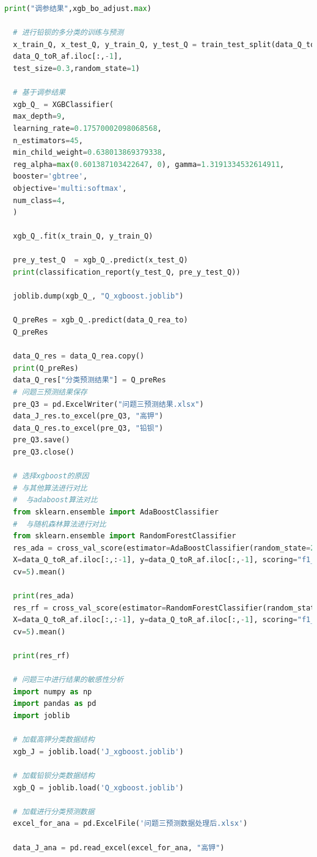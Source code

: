 \documentclass[withoutpreface,bwprint]{cumcmthesis} %
\begin{document}
\begin{appendices}
\begin{lstlisting}[language=python]
  print("调参结果",xgb_bo_adjust.max)
  
  # 进行铅钡的多分类的训练与预测
  x_train_Q, x_test_Q, y_train_Q, y_test_Q = train_test_split(data_Q_toR_af.iloc[:,:-1],
  data_Q_toR_af.iloc[:,-1],
  test_size=0.3,random_state=1)
  
  # 基于调参结果
  xgb_Q_ = XGBClassifier(
  max_depth=9,
  learning_rate=0.17570002098068568,
  n_estimators=45,
  min_child_weight=0.638013869379338,
  reg_alpha=max(0.601387103422647, 0), gamma=1.3191334532614911,
  booster='gbtree',
  objective='multi:softmax',
  num_class=4,
  )
  
  xgb_Q_.fit(x_train_Q, y_train_Q)
  
  pre_y_test_Q  = xgb_Q_.predict(x_test_Q)
  print(classification_report(y_test_Q, pre_y_test_Q))
  
  joblib.dump(xgb_Q_, "Q_xgboost.joblib")
  
  Q_preRes = xgb_Q_.predict(data_Q_rea_to)
  Q_preRes
  
  data_Q_res = data_Q_rea.copy()
  print(Q_preRes)
  data_Q_res["分类预测结果"] = Q_preRes
  # 问题三预测结果保存
  pre_Q3 = pd.ExcelWriter("问题三预测结果.xlsx")
  data_J_res.to_excel(pre_Q3, "高钾")
  data_Q_res.to_excel(pre_Q3, "铅钡")
  pre_Q3.save()
  pre_Q3.close()
  
  # 选择xgboost的原因
  # 与其他算法进行对比
  #  与adaboost算法对比
  from sklearn.ensemble import AdaBoostClassifier
  #  与随机森林算法进行对比
  from sklearn.ensemble import RandomForestClassifier
  res_ada = cross_val_score(estimator=AdaBoostClassifier(random_state=2022), 
  X=data_Q_toR_af.iloc[:,:-1], y=data_Q_toR_af.iloc[:,-1], scoring="f1_macro",
  cv=5).mean()
  
  print(res_ada)
  res_rf = cross_val_score(estimator=RandomForestClassifier(random_state=2022), 
  X=data_Q_toR_af.iloc[:,:-1], y=data_Q_toR_af.iloc[:,-1], scoring="f1_macro",
  cv=5).mean()
  
  print(res_rf)
  
  # 问题三中进行结果的敏感性分析
  import numpy as np
  import pandas as pd
  import joblib
  
  # 加载高钾分类数据结构
  xgb_J = joblib.load('J_xgboost.joblib')
  
  # 加载铅钡分类数据结构
  xgb_Q = joblib.load('Q_xgboost.joblib')
  
  # 加载进行分类预测数据
  excel_for_ana = pd.ExcelFile('问题三预测数据处理后.xlsx')
  
  data_J_ana = pd.read_excel(excel_for_ana, "高钾")
  

\end{lstlisting}
\end{appendices}
\end{document}
